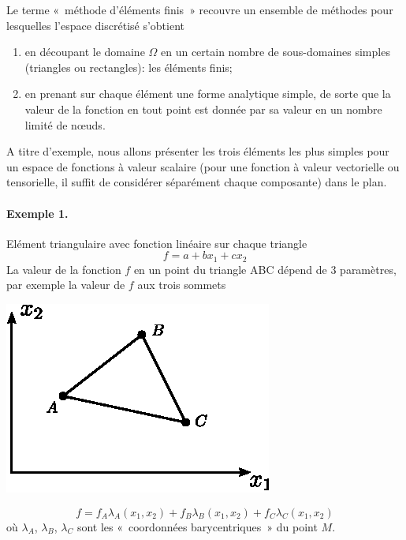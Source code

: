 Le terme «~méthode d'éléments finis~» recouvre un ensemble de méthodes pour lesquelles l'espace discrétisé s'obtient 
\begin{enumerate}
    \item en découpant le domaine $\Omega$ en un certain nombre de sous-domaines simples (triangles ou rectangles): les éléments finis; 
    \item en prenant sur chaque élément une forme analytique simple, de sorte que la valeur de la fonction en tout point est donnée par sa valeur en un nombre limité de nœuds.
\end{enumerate}
A titre d'exemple, nous allons présenter les trois éléments les  plus simples pour un espace de fonctions à valeur scalaire  (pour une fonction à valeur vectorielle ou tensorielle, il suffit de  considérer séparément chaque composante) dans le plan.  

\paragraph{Exemple 1.}
\begin{multicols}{2}
Elément triangulaire avec fonction linéaire sur chaque triangle 
\[
f = a +b x_1+cx_2
\]
La valeur de la fonction $f$ en un point du triangle ABC dépend de 3 paramètres, par exemple la valeur de $f$ aux trois sommets 
\columnbreak
\begin{center}
    \includegraphics{../images/T1_Ch09-02}
\end{center}
\end{multicols}
\begin{equation}
    f = f_A \lambda_A (x_1,x_2) + f_B \lambda_B (x_1,x_2) + f_C \lambda_C (x_1, x_2)
    \label{eq:Ch09-064}
\end{equation}
où $\lambda_A$, $\lambda_B$, $\lambda_C$ sont les «~coordonnées barycentriques~» du point $M$. 

